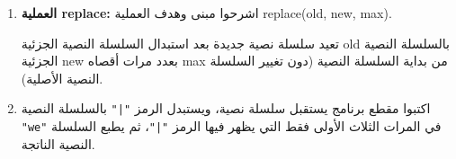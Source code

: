 \documentclass[14pt]{extarticle}
\begin{document}
\begin{enumerate}[resume, label=\textbf{تمرين \arabic*:}, wide=0pt, itemsep=2.2em]
\begin{enumerate}[label=\alph*.]
\ifwithsols
\begin{boxSolution}
\begin{english}
\begin{verbatim}
True
True
False
\end{verbatim}
\end{english}
\end{boxSolution}
\fi
\filbreak

\item اشرحوا باختصار مبنى وهدف كلٍّ من العمليتين التاليتين:
\begin{itemize}
\item \textenglish{startswith(sub, begin, end)}:
\item \textenglish{endswith(sub, begin, end)}:
\end{itemize}
\ifwithsols
\begin{boxSolution}
\begin{itemize}
\item \textenglish{startswith(sub, begin, end)}: تفحص ما إذا كان المقطع الجزئي من السلسلة النصية بين المؤشر \textenglish{begin} والمؤشر \textenglish{end} (لا يشمل \textenglish{end}) \textbf{يبدأ} بالسلسلة النصية الجزئية \textenglish{sub}، وتعيد \textenglish{True} أو \textenglish{False}.
\item \textenglish{endswith(sub, begin, end)}: تفحص ما إذا كان المقطع الجزئي من السلسلة النصية بين المؤشر \textenglish{begin} والمؤشر \textenglish{end} (لا يشمل \textenglish{end}) \textbf{ينتهي} بالسلسلة النصية الجزئية \textenglish{sub}، وتعيد \textenglish{True} أو \textenglish{False}.
\end{itemize}
\end{boxSolution}
\fi
\filbreak
\end{enumerate}
\filbreak

\item \textbf{العملية \textenglish{replace}:}
اشرحوا مبنى وهدف العملية \textenglish{replace(old, new, max)}.

\ifwithsols
\begin{boxSolution}
تعيد سلسلة نصية جديدة بعد استبدال السلسلة النصية الجزئية \textenglish{old} بالسلسلة النصية الجزئية \textenglish{new} بعدد مرات أقصاه \textenglish{max} من بداية السلسلة النصية (دون تغيير السلسلة النصية الأصلية).
\end{boxSolution}
\fi
\filbreak

\item اكتبوا مقطع برنامج يستقبل سلسلة نصية، ويستبدل الرمز \textenglish{\texttt{"|"}} بالسلسلة النصية \textenglish{\texttt{"we"}} في المرات الثلاث الأولى فقط التي يظهر فيها الرمز \textenglish{\texttt{"|"}}، ثم يطبع السلسلة النصية الناتجة.


\end{enumerate}
\end{document}
